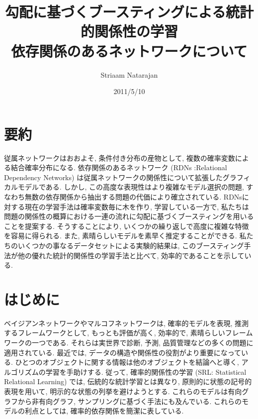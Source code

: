 \documentclass[a4paper]{jarticle}
\title{勾配に基づくブースティングによる統計的関係性の学習 \\ 依存関係のあるネットワークについて}    %
\author{Striaam Natarajan}   %
\date{2011/5/10}   %
\begin{document}
\maketitle   %

\setlength{\baselineskip}{20pt}   %
\tableofcontents   %
\listoffigures   %
\listoftables   %
\clearpage   %


\section{要約}

従属ネットワークはおおよそ, 条件付き分布の産物として, 複数の確率変数による結合確率分布になる. 依存関係のあるネットワーク (RDNs :Relational Dependency Networks) は従属ネットワークの関係性について拡張したグラフィカルモデルである. しかし, この高度な表現性はより複雑なモデル選択の問題, すなわち無数の依存関係から抽出する問題の代価により確立されている. RDNsに対する現在の学習手法は確率変数毎に木を作り, 学習している一方で, 私たちは問題の関係性の概算における一連の流れに勾配に基づくブースティングを用いることを提案する. そうすることにより, いくつかの繰り返しで高度に複雑な特徴を容易に得られる. また, 素晴らしいモデルを素早く推定することができる. 私たちのいくつかの事なるデータセットによる実験的結果は, このブースティング手法が他の優れた統計的関係性の学習手法と比べて, 効率的であることを示している.

\section{はじめに}

ベイジアンネットワークやマルコフネットワークは, 確率的モデルを表現, 推測するフレームワークとして, もっとも評価が高く, 効率的で, 素晴らしいフレームワークの一つである. それらは実世界で診断, 予測, 品質管理などの多くの問題に適用されている. 最近では, データの構造や関係性の役割がより重要になっている. ひとつのオブジェクトに関する情報は他のオブジェクトを結論へと導く, アルゴリズムの学習を手助けする. 従って, 確率的関係性の学習 (SRL: Statistical Relational Learning) では, 伝統的な統計学習とは異なり, 原則的に状態の記号的表現を用いて, 明示的な状態の列挙を避けようとする. これらのモデルは有向グラフから非有向グラフ, サンプリングに基づく手法にも及んでいる. 
これらのモデルの利点としては, 確率的依存関係を簡潔に表している. 
\end{document}
